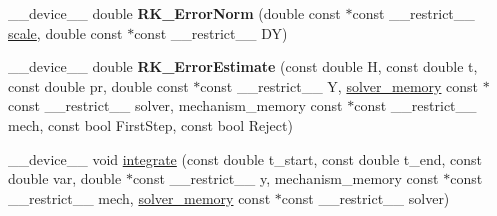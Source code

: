 \begin{DoxyCompactItemize}
\item 
\+\_\+\+\_\+device\+\_\+\+\_\+ double {\bfseries R\+K\+\_\+\+Error\+Norm} (double const $\ast$const \+\_\+\+\_\+restrict\+\_\+\+\_\+ \hyperlink{radau2a_8cu_a4fab5866449108992478041d2e51a28c}{scale}, double const $\ast$const \+\_\+\+\_\+restrict\+\_\+\+\_\+ DY)\hypertarget{radau2a_8cu_a52a2afa4e1728f2fb5116ae0c6315568}{}\label{radau2a_8cu_a52a2afa4e1728f2fb5116ae0c6315568}

\item 
\+\_\+\+\_\+device\+\_\+\+\_\+ double {\bfseries R\+K\+\_\+\+Error\+Estimate} (const double H, const double t, const double pr, double const $\ast$const \+\_\+\+\_\+restrict\+\_\+\+\_\+ Y, \hyperlink{structsolver__memory}{solver\+\_\+memory} const $\ast$const \+\_\+\+\_\+restrict\+\_\+\+\_\+ solver, mechanism\+\_\+memory const $\ast$const \+\_\+\+\_\+restrict\+\_\+\+\_\+ mech, const bool First\+Step, const bool Reject)\hypertarget{radau2a_8cu_a4b85075dc35ca99e0b06672bb1215ec9}{}\label{radau2a_8cu_a4b85075dc35ca99e0b06672bb1215ec9}

\item 
\+\_\+\+\_\+device\+\_\+\+\_\+ void \hyperlink{radau2a_8cu_a0a715eaa118190c4303b137d1a634470}{integrate} (const double t\+\_\+start, const double t\+\_\+end, const double var, double $\ast$const \+\_\+\+\_\+restrict\+\_\+\+\_\+ y, mechanism\+\_\+memory const $\ast$const \+\_\+\+\_\+restrict\+\_\+\+\_\+ mech, \hyperlink{structsolver__memory}{solver\+\_\+memory} const $\ast$const \+\_\+\+\_\+restrict\+\_\+\+\_\+ solver)
\end{DoxyCompactItemize}
